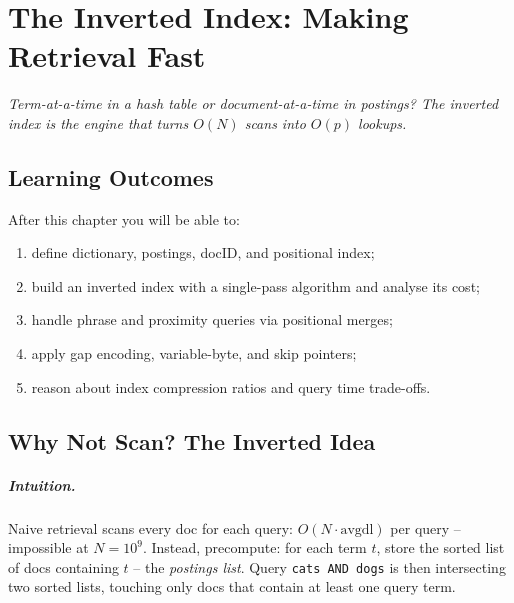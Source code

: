 \chapter{The Inverted Index: Making Retrieval Fast}\label{ch:index}
\begin{center}\small\textit{Term-at-a-time in a hash table or document-at-a-time in postings? The inverted index is the engine that turns $O(N)$ scans into $O(p)$ lookups.}\end{center}

\noindent{}
\vspace{0.4em}

\section*{Learning Outcomes}
After this chapter you will be able to:
\begin{enumerate}[label=(L\arabic*)]
  \item define dictionary, postings, docID, and positional index;
  \item build an inverted index with a single-pass algorithm and analyse its cost;
  \item handle phrase and proximity queries via positional merges;
  \item apply gap encoding, variable-byte, and skip pointers;
  \item reason about index compression ratios and query time trade-offs.
\end{enumerate}

\section{Why Not Scan? The Inverted Idea}\label{sec:why-inverted}
\paragraph{Intuition.} Naive retrieval scans every doc for each query: $O(N\cdot \text{avgdl})$ per query -- impossible at $N=10^9$. Instead, precompute: for each term $t$, store the sorted list of docs containing $t$ -- the \emph{postings list}. Query \texttt{cats AND dogs} is then intersecting two sorted lists, touching only docs that contain at least one query term.


